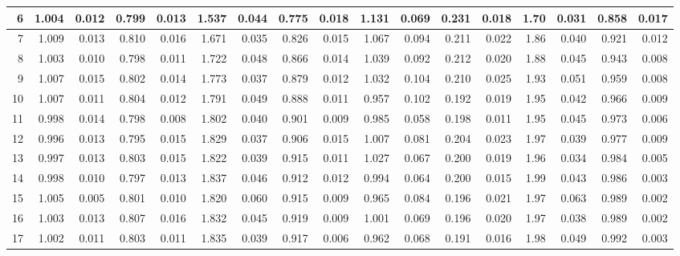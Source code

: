 \documentclass[
]{article}
\begin{document}
\begin{table}[H]
{\begin{tabular}[t]{r|r|r|r|r|r|r|r|r|r|r|r|r|r|r|r|r}
\hline
\hspace{1em}6 & 1.004 & 0.012 & 0.799 & 0.013 & 1.537 & 0.044 & 0.775 & 0.018 & 1.131 & 0.069 & 0.231 & 0.018 & 1.70 & 0.031 & 0.858 & 0.017\\
\hline
\hspace{1em}7 & 1.009 & 0.013 & 0.810 & 0.016 & 1.671 & 0.035 & 0.826 & 0.015 & 1.067 & 0.094 & 0.211 & 0.022 & 1.86 & 0.040 & 0.921 & 0.012\\
\hline
\hspace{1em}8 & 1.003 & 0.010 & 0.798 & 0.011 & 1.722 & 0.048 & 0.866 & 0.014 & 1.039 & 0.092 & 0.212 & 0.020 & 1.88 & 0.045 & 0.943 & 0.008\\
\hline
\hspace{1em}9 & 1.007 & 0.015 & 0.802 & 0.014 & 1.773 & 0.037 & 0.879 & 0.012 & 1.032 & 0.104 & 0.210 & 0.025 & 1.93 & 0.051 & 0.959 & 0.008\\
\hline
\hspace{1em}10 & 1.007 & 0.011 & 0.804 & 0.012 & 1.791 & 0.049 & 0.888 & 0.011 & 0.957 & 0.102 & 0.192 & 0.019 & 1.95 & 0.042 & 0.966 & 0.009\\
\hline
\hspace{1em}11 & 0.998 & 0.014 & 0.798 & 0.008 & 1.802 & 0.040 & 0.901 & 0.009 & 0.985 & 0.058 & 0.198 & 0.011 & 1.95 & 0.045 & 0.973 & 0.006\\
\hline
\hspace{1em}12 & 0.996 & 0.013 & 0.795 & 0.015 & 1.829 & 0.037 & 0.906 & 0.015 & 1.007 & 0.081 & 0.204 & 0.023 & 1.97 & 0.039 & 0.977 & 0.009\\
\hline
\hspace{1em}13 & 0.997 & 0.013 & 0.803 & 0.015 & 1.822 & 0.039 & 0.915 & 0.011 & 1.027 & 0.067 & 0.200 & 0.019 & 1.96 & 0.034 & 0.984 & 0.005\\
\hline
\hspace{1em}14 & 0.998 & 0.010 & 0.797 & 0.013 & 1.837 & 0.046 & 0.912 & 0.012 & 0.994 & 0.064 & 0.200 & 0.015 & 1.99 & 0.043 & 0.986 & 0.003\\
\hline
\hspace{1em}15 & 1.005 & 0.005 & 0.801 & 0.010 & 1.820 & 0.060 & 0.915 & 0.009 & 0.965 & 0.084 & 0.196 & 0.021 & 1.97 & 0.063 & 0.989 & 0.002\\
\hline
\hspace{1em}16 & 1.003 & 0.013 & 0.807 & 0.016 & 1.832 & 0.045 & 0.919 & 0.009 & 1.001 & 0.069 & 0.196 & 0.020 & 1.97 & 0.038 & 0.989 & 0.002\\
\hline
\hspace{1em}17 & 1.002 & 0.011 & 0.803 & 0.011 & 1.835 & 0.039 & 0.917 & 0.006 & 0.962 & 0.068 & 0.191 & 0.016 & 1.98 & 0.049 & 0.992 & 0.003\\

\end{tabular}}
\end{table}
\end{document}
